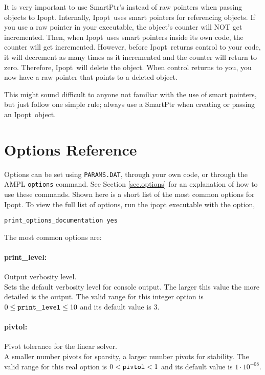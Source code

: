 \documentclass[letter,10pt]{article}
\newcommand{\Ipopt}{{\sc Ipopt}}
\begin{document}
It is very important to use SmartPtr's instead of raw pointers when
passing objects to \Ipopt. Internally, \Ipopt\ uses smart pointers for
referencing objects. If you use a raw pointer in your executable, the
object's counter will NOT get incremented. Then, when \Ipopt\ uses smart
pointers inside its own code, the counter will get
incremented. However, before \Ipopt\ returns control to your code, it
will decrement as many times as it incremented and the counter will
return to zero. Therefore, \Ipopt\ will delete the object. When control
returns to you, you now have a raw pointer that points to a deleted
object.

This might sound difficult to anyone not familiar with the use of
smart pointers, but just follow one simple rule; always use a SmartPtr
when creating or passing an \Ipopt\ object.

\section{Options Reference} \label{app.options_ref}
Options can be set using {\tt PARAMS.DAT}, through your own code, or through the 
AMPL {\tt options} command. See Section \ref{sec.options} for an explanation of
how to use these commands.
Shown here is a short list of the most common options for Ipopt. To view
the full list of options, run the ipopt executable with the option,
\begin{verbatim}
print_options_documentation yes
\end{verbatim}

The most common options are:


\paragraph{print\_level:} Output verbosity level. $\;$ \\
 Sets the default verbosity level for console
output. The larger this value the more detailed
is the output. The valid range for this integer option is
$0 \le {\tt print\_level } \le 10$
and its default value is $3$.


\paragraph{pivtol:} Pivot tolerance for the linear solver. $\;$ \\
 A smaller number pivots for sparsity, a larger
number pivots for stability. The valid range for this real option is 
$0 <  {\tt pivtol } <  1$
and its default value is $1 \cdot 10^{-08}$.
\end{document}
